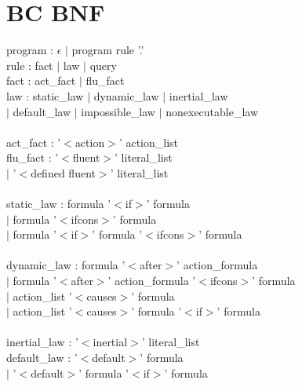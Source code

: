 \documentclass[10pt,a4paper]{article}
\begin{document}
\section{BC BNF}
    program : $\epsilon$ $|$ program rule '.' \\
    rule : fact $|$ law $|$ query \\
    fact : act\_fact $|$ flu\_fact \\
    law : static\_law $|$ dynamic\_law $|$ inertial\_law \\
    \hspace*{1 cm} $|$ default\_law $|$ impossible\_law $|$ nonexecutable\_law \\
    \\    
    act\_fact : '$<$action$>$' action\_list \\
    flu\_fact : '$<$fluent$>$' literal\_list \\
    \hspace*{1 cm} $|$ '$<$defined fluent$>$' literal\_list \\
    \\
    static\_law : formula '$<$if$>$' formula  \\
    \hspace*{1 cm}  $|$ formula '$<$ifcons$>$' formula \\
    \hspace*{1 cm}  $|$ formula '$<$if$>$' formula '$<$ifcons$>$' formula \\
    \\
    dynamic\_law : formula '$<$after$>$' action\_formula  \\
    \hspace*{1 cm}  $|$ formula '$<$after$>$' action\_formula '$<$ifcons$>$' formula  \\
    \hspace*{1 cm}  $|$ action\_list '$<$causes$>$' formula \\
    \hspace*{1 cm}  $|$ action\_list '$<$causes$>$' formula '$<$if$>$' formula \\
    \\
    inertial\_law : '$<$inertial$>$' literal\_list \\
    default\_law : '$<$default$>$' formula   \\
    \hspace*{1 cm}  $|$ '$<$default$>$' formula '$<$if$>$' formula  \\
\end{document}
